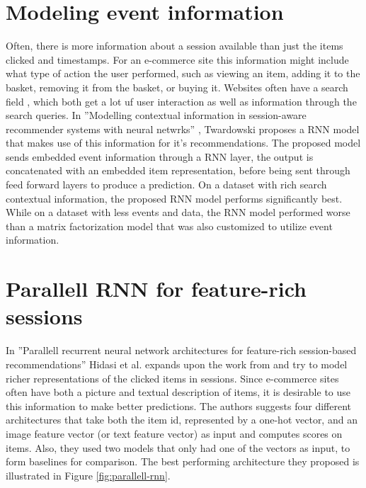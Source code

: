\section{Modeling event information}
Often, there is more information about a session available than just the items clicked and timestamps. For an e-commerce site this information might include what type of action the user performed, such as viewing an item, adding it to the basket, removing it from the basket, or buying it. Websites often have a search field , which both get a lot uf user interaction as well as information through the search queries. In ''Modelling contextual information in session-aware recommender systems with neural netwrks'' \cite{Twardowski:2016:MCI:2959100.2959162}, Twardowski proposes a RNN model that makes use of this information for it's recommendations. The proposed model sends embedded event information through a RNN layer, the output is concatenated with an embedded item representation, before being sent through feed forward layers to produce a prediction. On a dataset with rich search contextual information, the proposed RNN model performs significantly best. While on a dataset with less events and data, the RNN model performed worse than a matrix factorization model that was also customized to utilize event information.


\section{Parallell RNN for feature-rich sessions}
In ''Parallell recurrent neural network architectures for feature-rich session-based recommendations'' \cite{Hidasi:2016:PRN:2959100.2959167} Hidasi et al. expands upon the work from \cite{DBLP:journals/corr/HidasiKBT15} and try to model richer representations of the clicked items in sessions. Since e-commerce sites often have both a picture and textual description of items, it is desirable to use this information to make better predictions. The authors suggests four different architectures that take both the item id, represented by a one-hot vector, and an image feature vector (or text feature vector) as input and computes scores on items. Also, they used two models that only had one of the vectors as input, to form baselines for comparison. The best performing architecture they proposed is illustrated in Figure \ref{fig:parallell-rnn}.

